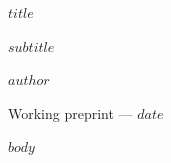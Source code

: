 \documentclass[11pt,letterpaper]{article}
\begin{document}
\thispagestyle{plain}
\begin{center}
{\LARGE\bfseries $title$\par}
\vspace{0.65em}
{\large $subtitle$\par}
\vspace{1em}
{\normalsize $author$\par}
\vspace{0.35em}
{\small Working preprint --- $date$\par}
\end{center}
\vspace{0.45em}
\begin{abstract}
\noindent $abstract$
\end{abstract}
\vspace{0.4em}
$body$
\end{document}

